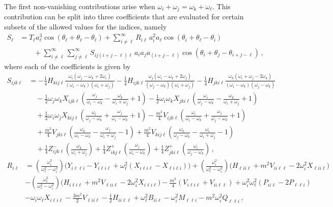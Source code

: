 \documentclass[letterpaper,11pt]{article}
\newcommand{\oi}{\omega_i}
\newcommand{\oj}{\omega_j}
\newcommand{\ok}{\omega_k}
\newcommand{\ol}{\omega_\ell}
\newcommand{\thi}{\theta_i}
\newcommand{\thj}{\theta_j}
\newcommand{\thl}{\theta_\ell}
\begin{document}
The first non-vanishing contributions arise when $\oi + \oj = \ok + \ol$. This contribution can be split into three coefficients that are evaluated for certain subsets of the allowed values for the indices, namely
\begin{align}
S_\ell &= T_\ell a^3_\ell \cos (\thl + \thl - \thl) + \sum_{i \neq \ell}^\infty R_{i \ell} \, a^2_i a_\ell \cos(\thi + \thl - \thi) \nonumber \\
& \qquad + \sum_{i \neq \ell}^\infty \sum_{j \neq \ell}^\infty S_{i j (i + j - \ell) \ell} \, a_i a_j a_{(i + j - \ell)} \cos(\thi + \thj - \theta_{i + j -\ell} ) \, ,
\end{align}
where each of the coefficients is given by
\begin{align}
\label{S_ppm}
S_{ijk\ell} &= - \frac{1}{4} H_{kij\ell} \frac{\oi (\oj - \ok + 2\oi)}{(\oi - \ok)(\oi + \oj)} -\frac{1}{4} H_{ijk\ell} \frac{\oj (\oi - \ok + 2\oj)}{(\oj - \ok)(\oi + \oj)} - \frac{1}{4} H_{jki\ell} \frac{\ok ( \oi + \oj - 2\ok)}{(\oi - \ok)(\oj - \ok)} \nonumber \\
%
& \quad - \frac{1}{2} \oj \ok X_{ijk\ell} \left( \frac{\oj}{\oi - \ok} - \frac{\ok}{\oi + \oj} + 1 \right) - \frac{1}{2} \oi \ok X_{jki\ell} \left( \frac{\oi}{\oj - \ok} - \frac{\ok}{\oi + \oj} + 1 \right) \nonumber \\
%
& \quad + \frac{1}{2} \oi \oj X_{kij\ell} \left( \frac{\oi}{\oj - \ok} + \frac{\oj}{\oi - \ok} + 1 \right) - \frac{m^2}{4} V_{ijk\ell} \left( \frac{\oi}{\oi - \ok} + \frac{\oj}{\oj - \ok} + 1\right) \nonumber \\
%
& \quad + \frac{m^2}{4} V_{jki\ell} \left( \frac{\ok}{\oi - \ok} - \frac{\oj}{\oi + \oj} - 1 \right) + \frac{m^2}{4} V_{kij\ell} \left( \frac{\ok}{\oj - \ok} - \frac{\oi}{\oi + \oj} - 1 \right) \nonumber \\
%
& \quad + \frac{1}{4}  Z^-_{ijk\ell} \left( \frac{\ok}{\oi + \oj}\right)  + \frac{1}{4}  Z^+_{ikj\ell} \left( \frac{\oj}{\oi - \ok}\right) + \frac{1}{4} Z^+_{jki\ell} \left( \frac{\oi}{\oj - \ok} \right) \, ,
\end{align}
\begin{align}
\label{R_ppm}
R_{i\ell} &= \left(\frac{\oi^2}{\ol^2 - \oi^2} \right) \big( Y_{i\ell \ell i} - Y_{i\ell i \ell} + \ol^2 ( X_{i\ell i \ell} - X_{\ell i \ell i}) \big) + \left(\frac{\oi^2}{\ol^2 - \oi^2}\right) \big( H_{\ell i i\ell} + m^2 V_{ii\ell \ell} - 2\oi^2 X_{\ell i i \ell} \big) \nonumber \\
%
& - \left(\frac{\ol^2}{\ol^2 - \oi^2} \right) \big( H_{i\ell i \ell} + m^2 V_{\ell i i \ell} - 2\oi^2 X_{i\ell i\ell} \big) - \frac{m^2}{4}(V_{i\ell i \ell} + V_{ii\ell \ell} ) + \oi^2 \ol^2 (P_{ii\ell} - 2P_{\ell \ell i}) \nonumber \\
%
& - \oi\ol X_{i\ell i \ell} - \frac{3m^2}{2} V_{\ell ii \ell} - \frac{1}{2} H_{ii\ell \ell} + \ol^2 B_{ii\ell} - \oi^2 M_{\ell \ell i} - m^2 \oi^2 Q_{\ell \ell i} \, ,
\end{align}
\end{document}
